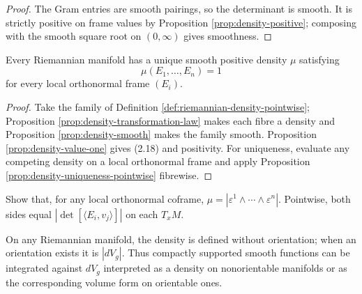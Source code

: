 \begin{proof}
\leanok
{}
\sketch The Gram entries are smooth pairings, so the determinant is smooth. It is strictly positive on frame values by Proposition \ref{prop:density-positive}; composing with the smooth square root on $(0,\infty)$ gives smoothness.
\end{proof}

\begin{proposition}\label{prop:riemannian-density}
\leanok
{}
Every Riemannian manifold has a unique smooth positive density $\mu$ satisfying
\begin{equation}
\mu(E_1,\ldots,E_n)=1 \tag{2.18}
\end{equation}
for every local orthonormal frame $(E_i)$.
\end{proposition}

\begin{proof}
\leanok
{}
\sketch Take the family of Definition \ref{def:riemannian-density-pointwise}; Proposition \ref{prop:density-transformation-law} makes each fibre a density and Proposition \ref{prop:density-smooth} makes the family smooth. Proposition \ref{prop:density-value-one} gives (2.18) and positivity. For uniqueness, evaluate any competing density on a local orthonormal frame and apply Proposition \ref{prop:density-uniqueness-pointwise} fibrewise.
\end{proof}

\begin{exercise}\label{exer:riemannian-density-formula}
\leanok
{}
Show that, for any local orthonormal coframe, $\mu=|\varepsilon^1\wedge\cdots\wedge\varepsilon^n|$. Pointwise, both sides equal $|\det[\langle E_i,v_j\rangle]|$ on each $T_xM$.
\end{exercise}

On any Riemannian manifold, the density is defined without orientation; when an orientation exists it is $|dV_g|$. Thus compactly supported smooth functions can be integrated against $dV_g$ interpreted as a density on nonorientable manifolds or as the corresponding volume form on orientable ones.

